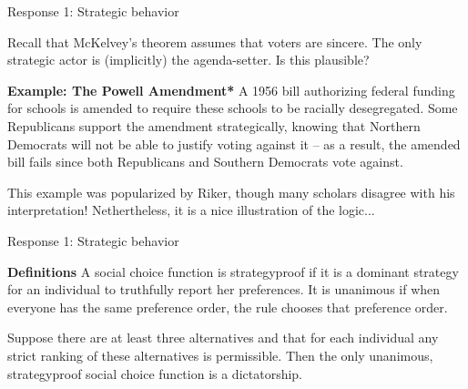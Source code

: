 \documentclass[11pt,aspectratio=169]{beamer}
\begin{document}
\begin{frame}{Response 1: Strategic behavior}

Recall that McKelvey's theorem assumes that voters are \alert{sincere}. The only strategic actor is (implicitly) the agenda-setter. Is this plausible?

\pause

\begin{tcolorbox}
\textbf{Example: The Powell Amendment*}
\newline A 1956 bill authorizing federal funding for schools is amended to require these schools to be racially desegregated. Some Republicans support the amendment strategically, knowing that Northern Democrats will not be able to justify voting against it -- as a result, the amended bill fails since both Republicans and Southern Democrats vote against.
\end{tcolorbox}

\pause 
\footnotesize *This example was popularized by Riker, though many scholars disagree with his interpretation! Nethertheless, it is a nice illustration of the logic...


\end{frame}
\begin{frame}{Response 1: Strategic behavior}

\textbf{Definitions}
\newline A social choice function is \alert{strategyproof} if it is a dominant strategy for an individual to truthfully report her preferences. It is \alert{unanimous} if when everyone has the same preference order, the rule chooses that preference order.

\vspace{1.5em}
\pause

\begin{theorem}
\vspace{0.2em}
Suppose there are at least three alternatives and that for each individual any strict ranking of these alternatives is permissible. Then the only unanimous, strategyproof social choice function is a dictatorship.
\end{theorem}


\end{frame}

\end{document}
